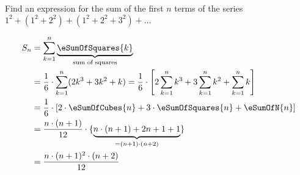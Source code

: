 

\question[3] Find an expression for the sum of the first $n$ terms of the series 
$1^2 + (1^2+2^2) + (1^2+2^2+3^2) + \ldots$


\ifprintanswers
\fi 

\begin{solution}[\halfpage]
	\begin{align}
		S_n &= \sum_{k=1}^{n}\underbrace{\eSumOfSquares{k}}_{\text{sum of squares}} \\
		&= \dfrac{1}{6}\cdot\sum_{k=1}^{n}(2k^3+3k^2+k) = 
    \dfrac{1}{6}\cdot\left[ 2\sum_{k=1}^{n} k^3 + 3\sum_{k=1}^{n} k^2 + \sum_{k=1}^{n} k \right] \\
		&= \dfrac{1}{6}\cdot\left[ 2\cdot\eSumOfCubes{n} + 3\cdot\eSumOfSquares{n} + \eSumOfN{n}\right] \\
		&= \dfrac{n\cdot(n+1)}{12}\cdot\lbrace\underbrace{n\cdot(n+1) + 2n + 1 + 1}_{=(n+1)\cdot(n+2)}\rbrace \\
		&= \dfrac{n\cdot(n+1)^2\cdot(n+2)}{12}
	\end{align}
\end{solution}
